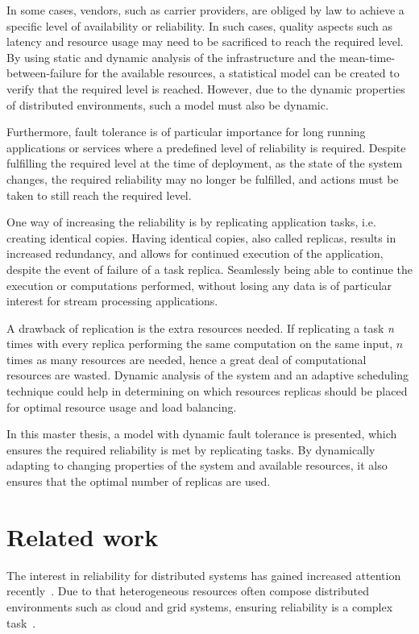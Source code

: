 \documentclass{cslthse-msc}
\begin{document}
In some cases, vendors, such as carrier providers, are obliged by law to achieve a specific level of availability or reliability. In such cases, quality aspects such as latency and resource usage may need to be sacrificed to reach the required level. By using static and dynamic analysis of the infrastructure and the mean-time-between-failure for the available resources, a statistical model can be created to verify that the required level is reached. However, due to the dynamic properties of distributed environments, such a model must also be dynamic. 

Furthermore, fault tolerance is of particular importance for long running applications or services where a predefined level of reliability is required. Despite fulfilling the required level at the time of deployment, as the state of the system changes, the required reliability may no longer be fulfilled, and actions must be taken to still reach the required level.

One way of increasing the reliability is by replicating application tasks, i.e. creating identical copies. Having identical copies, also called replicas, results in increased redundancy, and allows for continued execution of the application, despite the event of failure of a task replica. Seamlessly being able to continue the execution or computations performed, without losing any data is of particular interest for stream processing applications.

A drawback of replication is the extra resources needed. If replicating a task \emph{n} times with every replica performing the same computation on the same input, $n$ times as many resources are needed, hence a great deal of computational resources are wasted. Dynamic analysis of the system and an adaptive scheduling technique could help in determining on which resources replicas should be placed for optimal resource usage and load balancing.

In this master thesis, a model with dynamic fault tolerance is presented, which ensures the required reliability is met by replicating tasks. By dynamically adapting to changing properties of the system and available resources, it also ensures that the optimal number of replicas are used.

\section{Related work} \label{sec:introduction_related_work}
The interest in reliability for distributed systems has gained increased attention recently~\cite{replicationManagement}. Due to that heterogeneous resources often compose distributed environments such as cloud and grid systems, ensuring reliability is a complex task~\cite{cloudServiceRel, surveyReliabilityDistr}.
\end{document}
